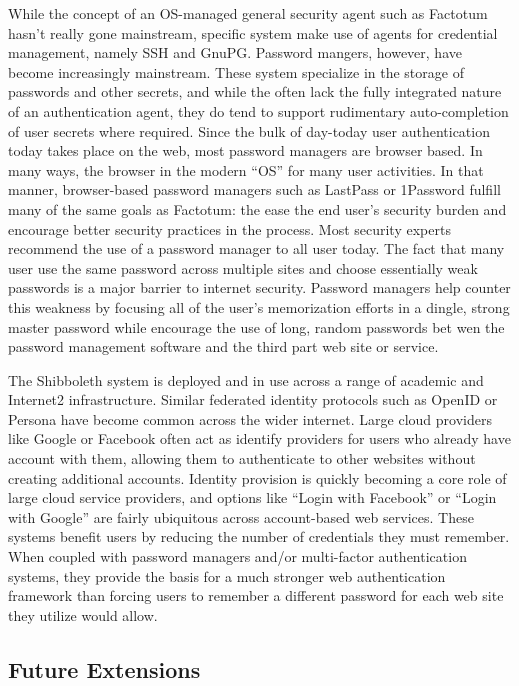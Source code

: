 \documentclass{sig-alternate}
\begin{document}
While the concept of an OS-managed general security agent such as
Factotum hasn't really gone mainstream, specific system make use of
agents for credential management, namely SSH and GnuPG. Password
mangers, however, have become increasingly mainstream. These system
specialize in the storage of passwords and other secrets, and while
the often lack the fully integrated nature of an authentication agent,
they do tend to support rudimentary auto-completion of user secrets
where required. Since the bulk of day-today user authentication today
takes place on the web, most password managers are browser based. In
many ways, the browser in the modern ``OS'' for many user
activities. In that manner, browser-based password managers such as
LastPass or 1Password fulfill many of the same goals as Factotum: the
ease the end user's security burden and encourage better security
practices in the process. Most security experts recommend the use of a
password manager to all user today. The fact that many user use the
same password across multiple sites and choose essentially weak
passwords is a major barrier to internet security. Password managers
help counter this weakness by focusing all of the user's memorization
efforts in a dingle, strong master password while encourage the use of
long, random passwords bet wen the password management software and
the third part web site or service.

The Shibboleth system is deployed and in use across a range of
academic and Internet2 infrastructure. Similar federated identity
protocols such as OpenID or Persona have become common across the
wider internet. Large cloud providers like Google or Facebook often
act as identify providers for users who already have account with
them, allowing them to authenticate to other websites without creating
additional accounts. Identity provision is quickly becoming a core
role of large cloud service providers, and options like ``Login with
Facebook'' or ``Login with Google'' are fairly ubiquitous across
account-based web services. These systems benefit users by reducing
the number of credentials they must remember. When coupled with
password managers and/or multi-factor authentication systems, they
provide the basis for a much stronger web authentication framework
than forcing users to remember a different password for each web site
they utilize would allow.

\subsection{Future Extensions}
\end{document}
